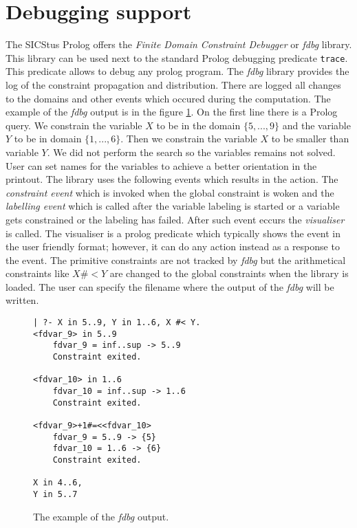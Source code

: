 \section{Debugging support}
The SICStus Prolog offers the {\em Finite Domain Constraint Debugger} or {\em fdbg} library.
This library can be used next to the standard Prolog debugging predicate \texttt{trace}. This
predicate allows to debug any prolog program. The {\em fdbg} library provides the
log of the constraint propagation and distribution. There are logged all changes to the
domains and other events which occured during the computation. The example of the {\em fdbg}
output is in the figure \ref{sicstus:fdbg}. On the first line there is a Prolog query.
We constrain the variable $X$ to be in the domain $\{5,...,9\}$ and the variable $Y$
to be in domain $\{1,...,6\}$. Then we constrain the variable $X$ to be smaller than
variable $Y$. We did not perform the search so the variables remains not solved.
User can set names for the variables to achieve a better orientation in the printout.
The library uses the following events which results in the action. The {\em constraint 
event} which is invoked when the global constraint is woken and the {\em labelling event}
which is called after the variable labeling is started or a variable gets constrained
or the labeling has failed. After such event eccurs the {\em visualiser} is called. 
The visualiser is a prolog predicate which typically shows the event in the user 
friendly format; however, it can do any action instead as a response to the event.
The primitive constraints are not tracked by {\em fdbg} but the arithmetical constraints
like $X \#< Y$ are changed to the global constraints when the library is loaded.
The user can specify the filename where the output of the {\em fdbg} will be written.

\begin{figure}
\caption{\label{sicstus:fdbg}The example of the {\em fdbg} output.}
\begin{verbatim}
| ?- X in 5..9, Y in 1..6, X #< Y.
<fdvar_9> in 5..9
    fdvar_9 = inf..sup -> 5..9
    Constraint exited.

<fdvar_10> in 1..6
    fdvar_10 = inf..sup -> 1..6
    Constraint exited.

<fdvar_9>+1#=<<fdvar_10>
    fdvar_9 = 5..9 -> {5}
    fdvar_10 = 1..6 -> {6}
    Constraint exited.
    
X in 4..6,
Y in 5..7 
\end{verbatim}   
\end{figure}

